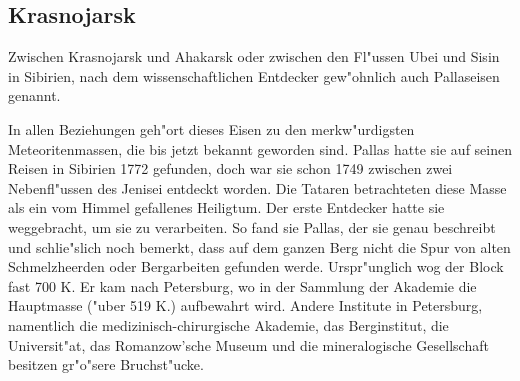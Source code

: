 \documentclass[a4paper, 11pt, oneside]{article}
\begin{document}
\subsection{Krasnojarsk}

Zwischen Krasnojarsk und Ahakarsk oder zwischen den Fl"ussen Ubei und Sisin in Sibirien, nach dem wissenschaftlichen Entdecker gew"ohnlich auch Pallaseisen genannt.

In allen Beziehungen geh"ort dieses Eisen zu den merkw"urdigsten Meteoritenmassen, die bis jetzt bekannt geworden sind. Pallas hatte sie auf seinen Reisen in Sibirien 1772 gefunden, doch war sie schon 1749 zwischen zwei Nebenfl"ussen des Jenisei entdeckt worden. Die Tataren betrachteten diese Masse als ein vom Himmel gefallenes Heiligtum. Der erste Entdecker hatte sie weggebracht, um sie zu verarbeiten. So fand sie Pallas, der sie genau beschreibt und schlie"slich noch bemerkt, dass auf dem ganzen Berg nicht die Spur von alten Schmelzheerden oder Bergarbeiten gefunden werde. Urspr"unglich wog der Block fast 700 K. Er kam nach Petersburg, wo in der Sammlung der Akademie die Hauptmasse ("uber 519 K.) aufbewahrt wird. Andere Institute in Petersburg, namentlich die medizinisch-chirurgische Akademie, das Berginstitut, die Universit"at, das Romanzow'sche Museum und die mineralogische Gesellschaft besitzen gr"o"sere Bruchst"ucke.
\end{document}
